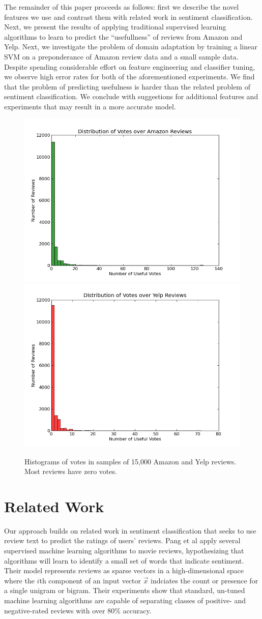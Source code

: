 \documentclass[letterpaper]{article}
\begin{document}
The remainder of this paper proceeds as follows: first we describe the novel 
features we use and contrast them with related work in sentiment 
classification.  Next, we present the results of applying traditional 
supervised learning algorithms to learn to predict the ``usefullness'' of 
reviews from Amazon and Yelp.  Next, we investigate the problem of domain 
adaptation by training a linear SVM on a preponderance of Amazon review data 
and a small sample data.  Despite spending considerable effort on feature 
engineering and classifier tuning, we observe high error rates for both of the 
aforementioned experiments.  We find that the problem of predicting usefulness 
is harder than the related problem of sentiment classification.  We conclude 
with suggestions for additional features and experiments that may result in 
a more accurate model.

\begin{figure}[h]
    \label{fig:vote-histos}
	\centering
	\includegraphics[width=0.30\linewidth]{amz_histo}
    \includegraphics[width=0.30\linewidth]{yelp_histo}
	\caption{Histograms of votes in samples of 15,000 Amazon and Yelp reviews.
    Most reviews have zero votes.}
\end{figure}

\section{Related Work}
Our approach builds on related work in sentiment classification that seeks to 
use review text to predict the ratings of users' reviews.  Pang et al 
\cite{PangSentimentClassification} apply several supervised machine learning 
algorithms to movie reviews, hypothesizing that algorithms will learn to
identify a small set of words that indicate sentiment.  Their model represents 
reviews as sparse vectors in a high-dimensional space where the $i$th component 
of an input vector $\vec{x}$ indciates the count or presence for a single 
unigram or bigram.  Their experiments show that standard, un-tuned machine 
learning algorithms are capable of separating classes of positive- and 
negative-rated reviews with over $80\%$ accuracy.  
\end{document}
